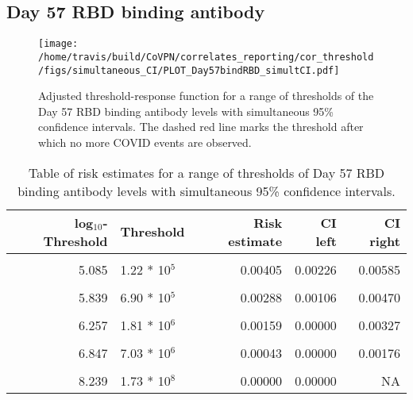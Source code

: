 \documentclass[]{book}
\theoremstyle{definition}
\theoremstyle{definition}
\theoremstyle{definition}
\newcommand{\1}{\mathbbm{1}}
\begin{document}
\newpage

\newpage

\newpage

\hypertarget{day-57-rbd-binding-antibody-2}{%
\subsection{Day 57 RBD binding antibody}\label{day-57-rbd-binding-antibody-2}}

\begin{figure}[H]
\centering
\texttt{[image: /home/travis/build/CoVPN/correlates\_reporting/cor\_threshold/figs/simultaneous\_CI/PLOT\_Day57bindRBD\_simultCI.pdf]}
\caption{Adjusted threshold-response function for a range of thresholds of the
  Day 57 RBD binding antibody levels with simultaneous 95\% confidence intervals. The dashed red line marks the threshold after which no more COVID events are observed. }
\end{figure}
\begin{table}[!h]

\caption{\label{tab:unnamed-chunk-381}Table of risk estimates for a range of thresholds of Day 57 RBD binding antibody levels with simultaneous 95\% confidence intervals.}
\centering
\begin{tabular}[t]{rlrrr}
\toprule
log$_{10}$-Threshold & Threshold & Risk estimate & CI left & CI right\\
\midrule
\cellcolor{gray!6}{4.062} & \cellcolor{gray!6}{1.15 * 10$^4$} & \cellcolor{gray!6}{0.00490} & \cellcolor{gray!6}{0.00302} & \cellcolor{gray!6}{0.00677}\\
5.085 & 1.22 * 10$^5$ & 0.00405 & 0.00226 & 0.00585\\
\cellcolor{gray!6}{5.507} & \cellcolor{gray!6}{3.21 * 10$^5$} & \cellcolor{gray!6}{0.00377} & \cellcolor{gray!6}{0.00188} & \cellcolor{gray!6}{0.00565}\\
5.839 & 6.90 * 10$^5$ & 0.00288 & 0.00106 & 0.00470\\
\cellcolor{gray!6}{6.048} & \cellcolor{gray!6}{1.12 * 10$^6$} & \cellcolor{gray!6}{0.00238} & \cellcolor{gray!6}{0.00056} & \cellcolor{gray!6}{0.00420}\\
6.257 & 1.81 * 10$^6$ & 0.00159 & 0.00000 & 0.00327\\
\cellcolor{gray!6}{6.499} & \cellcolor{gray!6}{3.16 * 10$^6$} & \cellcolor{gray!6}{0.00131} & \cellcolor{gray!6}{0.00000} & \cellcolor{gray!6}{0.00310}\\
6.847 & 7.03 * 10$^6$ & 0.00043 & 0.00000 & 0.00176\\
\cellcolor{gray!6}{7.181} & \cellcolor{gray!6}{1.52 * 10$^7$} & \cellcolor{gray!6}{0.00087} & \cellcolor{gray!6}{0.00000} & \cellcolor{gray!6}{0.00365}\\
8.239 & 1.73 * 10$^8$ & 0.00000 & 0.00000 & NA\\
\bottomrule
\end{tabular}
\end{table}
\end{document}
